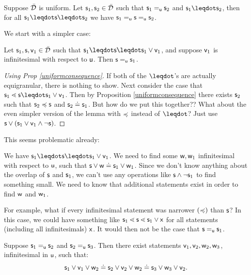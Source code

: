 \documentclass[11pt]{article}
\begin{document}
\begin{prop}
Suppose $\tdomain$ is uniform. Let $\stmt_1, \stmt_2 \in \tdomain$ such that $\stmt_1 \equ \stmt_2$ and $\stmt_1 \finer \stmt_2$, then for all $\stmt_1 \finer \stmt \finer \stmt_2$ we have $\stmt_1 \equ \stmt \equ \stmt_2$.
\end{prop}

We start with a simpler case:

\begin{prop}
Let $\stmt_1,\stmt,\stmt[v]_1\in\tdomain$ such that $\stmt_1\finer\stmt\finer\stmt_1\OR\stmt[v]_1$, and suppose $\stmt[v]_1$ is infinitesimal with respect to $\stmt[u]$. Then $\stmt\equ\stmt_1$. 
\end{prop}
\begin{proof}[Using Prop \ref{uniformconsequence}]
If both of the $\finer$'s are actually equigranular, there is nothing to show. Next consider the case that $\stmt_1\sfiner\stmt\finer\stmt_1\OR\stmt[v]_1$. Then by Proposition \ref{uniformconsequence} there exists $\stmt_2$ such that $\stmt_2\narrower\stmt$ and $\stmt_2\eqgran\stmt_1$. But how do we put this together?? What about the even simpler version of the lemma with $\narrower$ instead of $\finer$? Just use $\stmt\OR (\stmt_1\OR\stmt[v]_1 \AND \NOT\stmt)$.
\end{proof}

This seems problematic already:

We have $\stmt_1\finer\stmt\finer\stmt_1\OR\stmt[v]_1$. We need to find some $\stmt[w],\stmt[w]_1$ infinitesimal with respect to $\stmt[u]$, such that $\stmt\OR\stmt[w]\eqgran\stmt_1\OR\stmt[w]_1$. Since we don't know anything about the overlap of $\stmt$ and $\stmt_1$, we can't use any operations like $\stmt\AND\NOT\stmt_1$ to find something small. We need to know that additional statements exist in order to find $\stmt[w]$ and $\stmt[w]_1$. 

For example, what if every infinitesimal statement was narrower $(\narrower)$ than $\stmt$? In this case, we could have something like $\stmt_1\sfiner\stmt\sfiner\stmt_1\OR\stmt[x]$ for all statements (including all infinitesimals) $\stmt[x]$. It would then not be the case that $\stmt\equ\stmt_1$. 





\begin{prop}
Suppose $\stmt_1\equ\stmt_2$ and $\stmt_2\equ\stmt_3$. Then there exist statements  $\stmt[v]_1,\stmt[v]_2,\stmt[w]_2,\stmt[w]_3$, infinitesimal in $\stmt[u]$, such that:
$$
\stmt_1\OR\stmt[v]_1\OR\stmt[w]_2 \eqgran \stmt_2\OR\stmt[v]_2\OR\stmt[w]_2 \eqgran \stmt_3\OR\stmt[w]_3\OR\stmt[v]_2.
$$
\end{prop}
\end{document}
